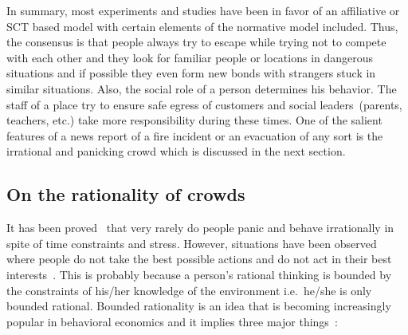 
In summary, most experiments and studies have been in favor of an affiliative or SCT based model with certain elements of the normative model included. Thus, the consensus is that people always try to escape while trying not to compete with each other and they look for familiar people or locations in dangerous situations and if possible they even form new bonds with strangers stuck in similar situations. Also, the social role of a person determines his behavior. The staff of a place try to ensure safe egress of customers and social leaders~(parents, teachers, etc.) take more responsibility during these times. One of the salient features of a news report of a fire incident or an evacuation of any sort is the irrational and panicking crowd which is discussed in the next section.

\subsection{On the rationality of crowds}
\label{LiteratureReview:RoleOfStress}

 It has been proved~\cite{Kobes:2009jx,Schadschneider:2008cz,Reicher:2008ep,Torres:2010tj,Paulsen:1984ti,Sime:1983uy} that very rarely do people panic and behave irrationally in spite of time constraints and stress. However, situations have been observed where people do not take the best possible actions and do not act in their best interests~\cite{Sandberg:1997tw}. This is probably because a person's rational thinking is bounded by the constraints of his/her knowledge of the environment i.e.\ he/she is only bounded rational. Bounded rationality is an idea that is becoming increasingly popular in behavioral economics and it implies three major things~\cite{Jones:1999tn}:

